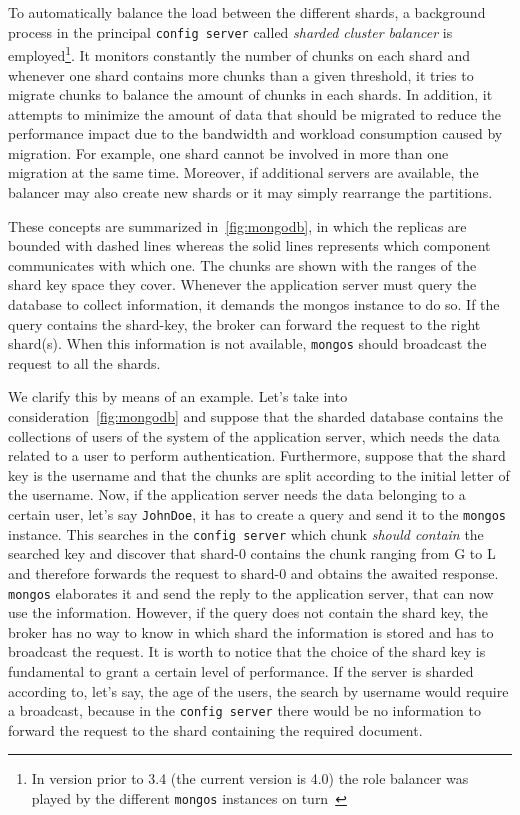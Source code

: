 To automatically balance the load between the different shards, a background
process in the principal \texttt{config server} called \emph{sharded cluster
balancer} is employed\footnote{In version prior to 3.4 (the current version is
4.0) the role balancer was played by the different \texttt{mongos} instances on
turn~\cite{bib:mongodb-docs}}. It monitors constantly the number of chunks on
each shard and  whenever one  shard contains more chunks than a given threshold,
it tries to migrate chunks to balance the amount of chunks in each shards. In
addition, it attempts to minimize the amount of data that should be migrated to
reduce the performance impact due to the bandwidth and workload consumption
caused by migration. For example, one shard cannot be involved in more than one
migration at the same time. Moreover, if additional servers are available, the
balancer may also create new shards or it may simply rearrange the partitions.

These concepts are summarized in~\autoref{fig:mongodb}, in which the replicas
are bounded with dashed lines whereas the solid lines represents which component
communicates with which one. The chunks are shown with the ranges of the shard
key space they cover. Whenever the application server must query the database to
collect information, it demands the mongos instance to do so. If the query
contains the shard-key, the broker can forward the request to the right
shard(s). When this information is not available, \texttt{mongos} should
broadcast the request to all the shards.

We clarify this by means of an example. Let's take into
consideration~\autoref{fig:mongodb} and suppose that the sharded database
contains the collections of users of the system of the application server, which
needs the data related to a user to perform authentication. Furthermore, suppose
that the shard key is the username and that the chunks are split according to
the initial letter of the username. Now, if the application server needs the
data belonging to a certain user, let's say \texttt{JohnDoe}, it has to create a
query and send it to the \texttt{mongos} instance. This searches in the
\texttt{config server} which chunk \emph{should contain} the searched key and
discover that shard-0 contains the chunk ranging from G to L and therefore
forwards the request to shard-0 and obtains the awaited response.
\texttt{mongos} elaborates it and send the reply to the application server, that
can now use the information. However, if the query does not contain the shard
key, the broker has no way to know in which shard the information is stored and
has to broadcast the request. It is worth to notice that the choice of the shard
key is fundamental to grant a certain level of performance. If the server is
sharded according to, let's say, the age of the users, the search by username
would require a broadcast, because in the \texttt{config server} there would be
no information to forward the request to the shard containing the required
document.


